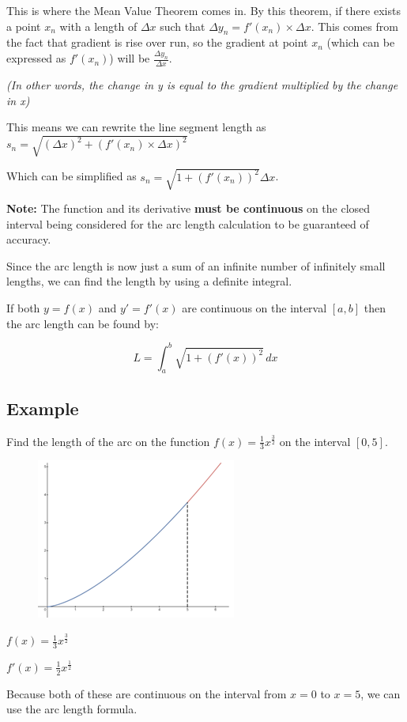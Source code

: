 \documentclass[../main.tex]{subfiles}
\begin{document}
This is where the Mean Value Theorem comes in. By this theorem, if there exists a point $x_n$ with a length of $\Delta x$ such that $\Delta y_n=f'(x_n)\times \Delta x$. This comes from the fact that gradient is rise over run, so the gradient at point $x_n$ (which can be expressed as $f'(x_n)$) will be $\frac{\Delta y_n}{\Delta x}$.

\textit{(In other words, the change in y is equal to the gradient multiplied by the change in x)}

This means we can rewrite the line segment length as $s_n=\sqrt{(\Delta x)^2+(f'(x_n)\times \Delta x)^2}$

Which can be simplified as $s_n=\sqrt{1+(f'(x_n))^2}\Delta x$.

\textbf{Note:} The function and its derivative \textbf{must be continuous} on the closed interval being considered for the arc length calculation to be guaranteed of accuracy.

Since the arc length is now just a sum of an infinite number of infinitely small lengths, we can find the length by using a definite integral.

If both $y=f(x)$ and $y'=f'(x)$ are continuous on the interval $[a,b]$ then the arc length can be found by:

\[L=\int_a^b \sqrt{1+(f'(x))^2}\,dx\]

\subsection*{Example}
Find the length of the arc on the function $f(x)=\frac{1}{3}x^{\frac{3}{2}}$ on the interval $[0,5]$.

\begin{figure}[h]
    \centering
    \includegraphics[width=0.3\linewidth]{images/arclength4.png}
\end{figure}

$f(x)=\frac{1}{3}x^{\frac{3}{2}}$

$f'(x)=\frac{1}{2}x^{\frac{1}{2}}$

Because both of these are continuous on the interval from $x=0$ to $x=5$, we can use the arc length formula.
\end{document}
